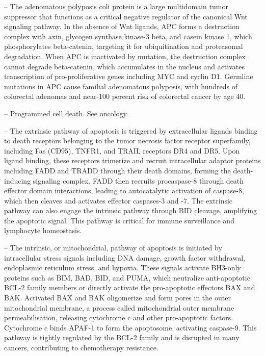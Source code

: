 -- The adenomatous polyposis coli protein is a large multidomain tumor suppressor that functions as a critical negative regulator of the canonical Wnt signaling pathway. In the absence of Wnt ligands, APC forms a destruction complex with axin, glycogen synthase kinase-3 beta, and casein kinase 1, which phosphorylates beta-catenin, targeting it for ubiquitination and proteasomal degradation. When APC is inactivated by mutation, the destruction complex cannot degrade beta-catenin, which accumulates in the nucleus and activates transcription of pro-proliferative genes including MYC and cyclin D1. Germline mutations in APC cause familial adenomatous polyposis, with hundreds of colorectal adenomas and near-100 percent risk of colorectal cancer by age 40.

-- Programmed cell death. See oncology.

-- The extrinsic pathway of apoptosis is triggered by extracellular ligands binding to death receptors belonging to the tumor necrosis factor receptor superfamily, including Fas (CD95), TNFR1, and TRAIL receptors DR4 and DR5. Upon ligand binding, these receptors trimerize and recruit intracellular adaptor proteins including FADD and TRADD through their death domains, forming the death-inducing signaling complex. FADD then recruits procaspase-8 through death effector domain interactions, leading to autocatalytic activation of caspase-8, which then cleaves and activates effector caspases-3 and -7. The extrinsic pathway can also engage the intrinsic pathway through BID cleavage, amplifying the apoptotic signal. This pathway is critical for immune surveillance and lymphocyte homeostasis.

-- The intrinsic, or mitochondrial, pathway of apoptosis is initiated by intracellular stress signals including DNA damage, growth factor withdrawal, endoplasmic reticulum stress, and hypoxia. These signals activate BH3-only proteins such as BIM, BAD, BID, and PUMA, which neutralize anti-apoptotic BCL-2 family members or directly activate the pro-apoptotic effectors BAX and BAK. Activated BAX and BAK oligomerize and form pores in the outer mitochondrial membrane, a process called mitochondrial outer membrane permeabilisation, releasing cytochrome c and other pro-apoptotic factors. Cytochrome c binds APAF-1 to form the apoptosome, activating caspase-9. This pathway is tightly regulated by the BCL-2 family and is disrupted in many cancers, contributing to chemotherapy resistance.

